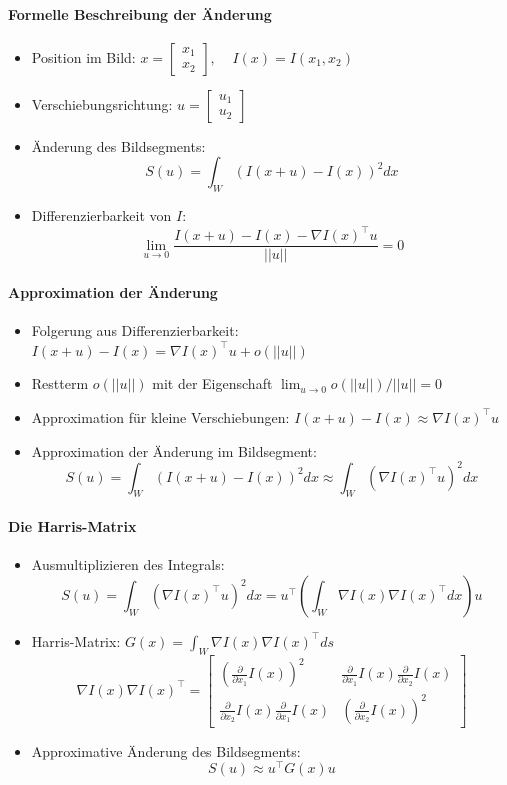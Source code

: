 \documentclass[12pt, a4paper, oneside]{article}
\begin{document}
\paragraph*{Formelle Beschreibung der Änderung}
\begin{itemize}
    \item Position im Bild: 
    $x=\begin{bmatrix}
        x_1 \\
        x_2
    \end{bmatrix},\;\;\;\;
    I(x)=I(x_1,x_2)$
    \item Verschiebungsrichtung: $u=\begin{bmatrix}
        u_1 \\
        u_2
    \end{bmatrix}$
    \item Änderung des Bildsegments:
    $$
    S(u)=\int_W (I(x+u)-I(x))^2dx
    $$
    \item Differenzierbarkeit von $I$:
    $$
    \lim_{u\to 0}\frac{I(x+u)-I(x)-\nabla I(x)^\top u}{||u||}=0
    $$
\end{itemize}
\paragraph*{Approximation der Änderung}
\begin{itemize}
    \item Folgerung aus Differenzierbarkeit: $I(x+u)-I(x)=\nabla I(x)^\top u + o(||u||)$
    \item Restterm $o(||u||)$ mit der Eigenschaft $\lim_{u\to 0}o(||u||)/||u||=0$
    \item Approximation für kleine Verschiebungen: $I(x+u)-I(x)\approx \nabla I(x)^\top u$
    \item Approximation der Änderung im Bildsegment:
    $$
    S(u)=\int_W(I(x+u)-I(x))^2dx\approx\int_W(\nabla I(x)^\top u)^2dx
    $$
\end{itemize}
\paragraph*{Die Harris-Matrix}
\begin{itemize}
    \item Ausmultiplizieren des Integrals:
    $$
    S(u)=\int_W(\nabla I(x)^\top u)^2dx=u^\top (\int_W \nabla I(x)\nabla I(x)^\top dx)u
    $$
    \item Harris-Matrix: $G(x)=\int_W \nabla I(x)\nabla I(x)^\top ds$
    $$\nabla I(x)\nabla I(x)^\top =\begin{bmatrix}
        (\frac{\partial}{\partial x_1}I(x))^2 & \frac{\partial}{\partial x_1}I(x)\frac{\partial}{\partial x_2}I(x) \\
        \frac{\partial}{\partial x_2}I(x)\frac{\partial}{\partial x_1}I(x) & (\frac{\partial}{\partial x_2}I(x))^2
    \end{bmatrix}
    $$
    \item Approximative Änderung des Bildsegments:
    $$
    S(u)\approx u^\top G(x)u
    $$
\end{itemize}
\end{document}
